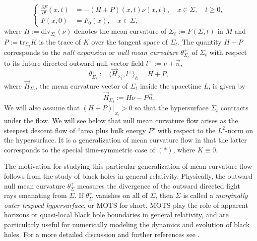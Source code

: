 \documentclass[11pt]{amsart}
\begin{document}
\[\tag{$*$}
\left\lbrace
\begin{aligned}
 \frac{\partial F}{\partial t}(x,t) & = -(H+P)(x,t)\nu(x,t), \quad x\in\Sigma,\quad t\geq0, \\
                         F(x,0) & = F_{0}(x),\quad x\in\Sigma{},
\end{aligned}
\right.
\]
where $H:=\text{div}_{\Sigma_t}(\nu)$ denotes the mean curvature of $\Sigma_t:=F(\Sigma,t)$ in $M$ and $P:=\text{tr}_{\Sigma_t}K$ is the trace of $K$ over the tangent space of $\Sigma_t$. The quantity $H+P$ corresponds to the {\it null expansion} or \textit{null mean curvature} $\theta_{\Sigma_t}^+$ of $\Sigma_t$ with respect to its future directed outward null vector field $l^+:=\nu+\vec{n}$,
\begin{equation*}
\theta^+_{\Sigma_t}:=\langle\vec{H}_{\Sigma_t},l^+\rangle_h=H+P,
\end{equation*}
where $\vec{H}_{\Sigma_t}$, the mean curvature vector of $\Sigma_t$ inside the spacetime $L$, is given by 
\begin{equation*}\vec{H}_{\Sigma_t}:=H\nu-P\vec{n}.
\end{equation*} 
We will also assume that $(H+P)|_{_{\Sigma_0}}>0$ so that the hypersurface $\Sigma_{t}$ contracts under the flow. We will see below that null mean curvature flow arises as the steepest descent flow of ``area plus bulk energy $P$" with respect to the $L^2$-norm on the hypersurface. It is a generalization of mean curvature flow in that the latter corresponds to the special time-symmetric case of $(*)$, where $K\equiv0$. 

The motivation for studying this particular generalization of mean curvature flow follows from the study of black holes in general relativity. Physically, the outward null mean curvature $\theta^+_{\Sigma}$ measures the divergence of the outward directed light rays emanating from $\Sigma$. If $\theta_{\Sigma}^+$ vanishes on all of $\Sigma$, then $\Sigma$ is called a \textit{marginally outer trapped hypersurface}, or MOTS for short. MOTS play the role of apparent horizons or quasi-local black hole boundaries in general relativity, and are particularly useful for numerically modeling the dynamics and evolution of black holes. For a more detailed discussion and further references see \cite{AMS08,  AM09, AM10}.
\end{document}
